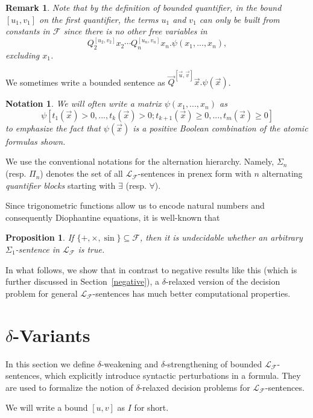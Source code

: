 \documentclass[conference]{IEEEtran}
\newtheorem{notation}[theorem]{Notation}
\newtheorem{proposition}[theorem]{Proposition}
\newtheorem{remark}[theorem]{Remark}
\begin{document}
\begin{remark} Note that by the definition of bounded quantifier, in the bound $[u_1,v_1]$ on the first quantifier, the terms $u_1$ and $v_1$ can only be built from constants in $\mathcal{F}$ since there is no other free variables in 
$$Q_2^{[u_2,v_2]}x_2\cdots Q_n^{[u_n,v_n]}x_n.\psi(x_1,...,x_n),$$ excluding $x_1$. 
\end{remark}
We sometimes write a bounded sentence as $\vec Q^{[\vec u,\vec v]}\vec x.\psi(\vec x)$. 


\begin{notation}
We will often write a matrix $\psi(x_1,...,x_n)$ as 
$$\psi[t_1(\vec x)>0,...,t_k(\vec x)>0; t_{k+1}(\vec x)\geq 0,...,t_m(\vec x)\geq 0]$$
to emphasize the fact that $\psi(\vec x)$ is a positive Boolean combination of the atomic formulas shown. 
\end{notation}

We use the conventional notations for the alternation hierarchy. Namely, $\Sigma_n$ (resp. $\Pi_n$) denotes the set of all $\mathcal{L}_{\mathcal{F}}$-sentences in prenex form with $n$ alternating {\em quantifier blocks} starting with $\exists$ (resp. $\forall$). 

Since trigonometric functions allow us to encode natural numbers and consequently Diophantine equations, it is well-known that
\begin{proposition}
If $\{+,\times,\sin\}\subseteq \mathcal{F}$, then it is undecidable whether an arbitrary $\Sigma_1$-sentence in $\mathcal{L}_{\mathcal{F}}$ is true.
\end{proposition}
In what follows, we show that in contrast to negative results like this (which is further discussed in Section~\ref{negative}), a $\delta$-relaxed version of the decision problem for general $\mathcal{L}_{\mathcal{F}}$-sentences has much better computational properties. 


\section{$\delta$-Variants}\label{vary}

In this section we define $\delta$-weakening and $\delta$-strengthening of bounded $\mathcal{L}_{\mathcal{F}}$-sentences, which explicitly introduce syntactic perturbations in a formula. They are used to formalize the notion of $\delta$-relaxed decision problems for $\mathcal{L}_{\mathcal{F}}$-sentences. 

We will write a bound $[u,v]$ as $I$ for short. 
\end{document}

